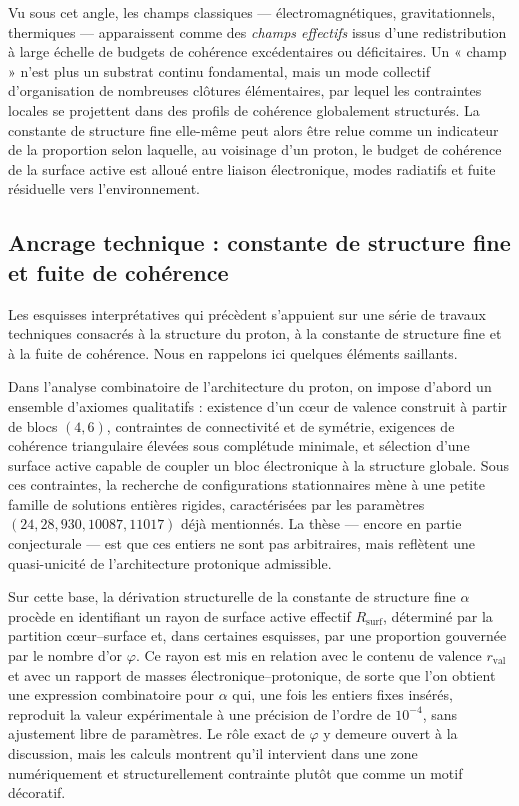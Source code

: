 \documentclass[11pt,a4paper]{article}
\theoremstyle{definition}
\begin{document}
Vu sous cet angle, les champs classiques — électromagnétiques, gravitationnels, thermiques — apparaissent comme des \emph{champs effectifs} issus d’une redistribution à large échelle de budgets de cohérence excédentaires ou déficitaires.\cite{Laubscher_EffectiveFields_2024,Laubscher_CavityModes_PDL_2024} Un « champ » n’est plus un substrat continu fondamental, mais un mode collectif d’organisation de nombreuses clôtures élémentaires, par lequel les contraintes locales se projettent dans des profils de cohérence globalement structurés. La constante de structure fine elle-même peut alors être relue comme un indicateur de la proportion selon laquelle, au voisinage d’un proton, le budget de cohérence de la surface active est alloué entre liaison électronique, modes radiatifs et fuite résiduelle vers l’environnement.

\subsection{Ancrage technique : constante de structure fine et fuite de cohérence}

Les esquisses interprétatives qui précèdent s’appuient sur une série de travaux techniques consacrés à la structure du proton, à la constante de structure fine et à la fuite de cohérence.\cite{Laubscher_ProtonArch_v2_2024,Laubscher_Alpha_v2_2024,Laubscher_Leakage_Probability_2024,Laubscher_UniversalCoherenceLeakage_2024} Nous en rappelons ici quelques éléments saillants.

Dans l’analyse combinatoire de l’architecture du proton, on impose d’abord un ensemble d’axiomes qualitatifs : existence d’un cœur de valence construit à partir de blocs \((4,6)\), contraintes de connectivité et de symétrie, exigences de cohérence triangulaire élevées sous complétude minimale, et sélection d’une surface active capable de coupler un bloc électronique à la structure globale.\cite{Laubscher_ProtonArch_v2_2024} Sous ces contraintes, la recherche de configurations stationnaires mène à une petite famille de solutions entières rigides, caractérisées par les paramètres \((24, 28, 930, 10087, 11017)\) déjà mentionnés. La thèse — encore en partie conjecturale — est que ces entiers ne sont pas arbitraires, mais reflètent une quasi-unicité de l’architecture protonique admissible.

Sur cette base, la dérivation structurelle de la constante de structure fine \(\alpha\) procède en identifiant un rayon de surface active effectif \(R_{\mathrm{surf}}\), déterminé par la partition cœur–surface et, dans certaines esquisses, par une proportion gouvernée par le nombre d’or \(\varphi\).\cite{Laubscher_GoldenRatio_Sketch_2024,Laubscher_Alpha_v2_2024} Ce rayon est mis en relation avec le contenu de valence \(r_{\mathrm{val}}\) et avec un rapport de masses électronique–protonique, de sorte que l’on obtient une expression combinatoire pour \(\alpha\) qui, une fois les entiers fixes insérés, reproduit la valeur expérimentale à une précision de l’ordre de \(10^{-4}\), sans ajustement libre de paramètres.\cite{Laubscher_Alpha_v2_2024} Le rôle exact de \(\varphi\) y demeure ouvert à la discussion, mais les calculs montrent qu’il intervient dans une zone numériquement et structurellement contrainte plutôt que comme un motif décoratif.
\end{document}

